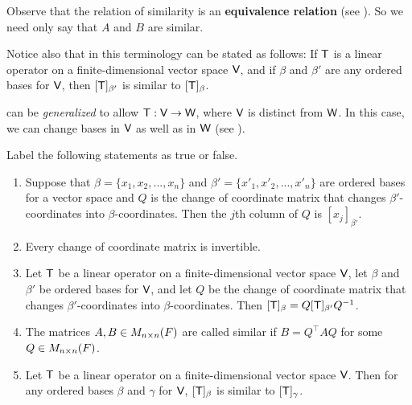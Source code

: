 \begin{remark} \label{remark 2.5.3}
Observe that the relation of similarity is an \textbf{equivalence relation} (see ).
So we need only say that \(A\) and \(B\) are similar.

Notice also that in this terminology  can be stated as follows:
If \(\textsf{T}\) is a linear operator on a finite-dimensional vector space \(\textsf{V}\), and if \(\beta\) and \(\beta'\) are any ordered bases for \(\textsf{V}\), then \([\textsf{T}]_{\beta'}\) is similar to \([\textsf{T}]_{\beta}\).
\end{remark}

\begin{remark} \label{remark 2.5.4}
 can be \emph{generalized} to allow \(\textsf{T} : \textsf{V} \to \textsf{W}\), where \(\textsf{V}\) is distinct from \(\textsf{W}\).
In this case, we can change bases in \(\textsf{V}\) as well as in \(\textsf{W}\) (see ).
\end{remark}

\exercisesection

\begin{exercise} \label{exercise 2.5.1}
Label the following statements as true or false.
\begin{enumerate}
\item Suppose that \(\beta = \{ x_1, x_2, ..., x_n \}\) and \(\beta' = \{ x'_1, x'_2, ..., x'_n \}\) are ordered bases for a vector space
and \(Q\) is the change of coordinate matrix that changes \(\beta'\)-coordinates into \(\beta\)-coordinates.
Then the \(j\)th column of \(Q\) is \([x_j]_{\beta'}\).

\item Every change of coordinate matrix is invertible. 

\item Let \(\textsf{T}\) be a linear operator on a finite-dimensional vector space \(\textsf{V}\), let \(\beta\) and \(\beta'\) be ordered bases for \(\textsf{V}\),
and let \(Q\) be the change of coordinate matrix that changes \(\beta'\)-coordinates into \(\beta\)-coordinates.
Then \([\textsf{T}]_{\beta} = Q [\textsf{T}]_{\beta'} Q^{-1}\).

\item The matrices \(A, B \in M_{n \times n}(F)\) are called similar if \(B = Q^\top A Q\) for some \(Q \in M_{n \times n}(F)\).

\item Let \(\textsf{T}\) be a linear operator on a finite-dimensional vector space \(\textsf{V}\).
Then for any ordered bases \(\beta\) and \(\gamma\) for \(\textsf{V}\), \([\textsf{T}]_{\beta}\) is similar to \([\textsf{T}]_{\gamma}\).
\end{enumerate}
\end{exercise}


